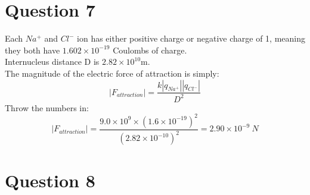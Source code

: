 \documentclass[10pt]{article}
\begin{document}
\section{Question 7}
Each $Na^+$ and $Cl^{-}$ ion has either positive charge or negative charge of 1, meaning they both have
$1.602\times10^{-19}$ Coulombs of charge. \\ 
Internucleus distance D is $2.82 \times 10^{10}$m. \\
The magnitude of the electric force of attraction is simply:
\begin{displaymath}
|F_{attraction}|=\frac{k|q_{Na^+}||q_{Cl^-}|}{D^2}
\end{displaymath}
Throw the numbers in:
\begin{displaymath}
|F_{attraction}|=\frac{9.0 \times 10^9 \times(1.6 \times 10^{-19})^2 }{(2.82 \times 10^{-10})^2}=2.90\times 10^{-9} \ N 
\end{displaymath}

\pagebreak
\section{Question 8}
\end{document}

